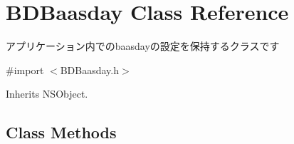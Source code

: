 \hypertarget{interface_b_d_baasday}{\section{B\-D\-Baasday Class Reference}
\label{interface_b_d_baasday}
}


アプリケーション内でのbaasdayの設定を保持するクラスです  




{\ttfamily \#import $<$B\-D\-Baasday.\-h$>$}



Inherits N\-S\-Object.

\subsection*{Class Methods}
